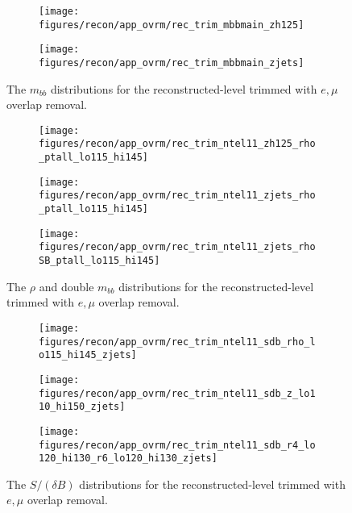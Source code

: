 \begin{figure}[!htbp]\captionsetup{justification=centering}
\begin{center}
\begin{subfigure}[t]{18pc}\centering\texttt{[image: figures/recon/app\_ovrm/rec\_trim\_mbbmain\_zh125]}\caption{}\end{subfigure}
\begin{subfigure}[t]{18pc}\centering\texttt{[image: figures/recon/app\_ovrm/rec\_trim\_mbbmain\_zjets]}\caption{}\end{subfigure}
\caption{\label{fig:mbbwz}The $m_{bb}$ distributions for the reconstructed-level trimmed with $e,\mu$ overlap removal.}
\end{center}
\end{figure}
\begin{figure}[!htbp]\captionsetup{justification=centering}
\begin{center}
\begin{subfigure}[t]{18pc}\centering\texttt{[image: figures/recon/app\_ovrm/rec\_trim\_ntel11\_zh125\_rho\_ptall\_lo115\_hi145]}\caption{}\end{subfigure}
\begin{subfigure}[t]{18pc}\centering\texttt{[image: figures/recon/app\_ovrm/rec\_trim\_ntel11\_zjets\_rho\_ptall\_lo115\_hi145]}\caption{}\end{subfigure}
\begin{subfigure}[t]{18pc}\centering\texttt{[image: figures/recon/app\_ovrm/rec\_trim\_ntel11\_zjets\_rhoSB\_ptall\_lo115\_hi145]}\caption{}\end{subfigure}
\caption{\label{fig:mbbwz}The $\rho$ and double $m_{bb}$ distributions for the reconstructed-level trimmed with $e,\mu$ overlap removal.}
\end{center}
\end{figure}
\begin{figure}[!htbp]\captionsetup{justification=centering}
\begin{center}
\begin{subfigure}[t]{18pc}\centering\texttt{[image: figures/recon/app\_ovrm/rec\_trim\_ntel11\_sdb\_rho\_lo115\_hi145\_zjets]}\caption{}\end{subfigure}
\begin{subfigure}[t]{18pc}\centering\texttt{[image: figures/recon/app\_ovrm/rec\_trim\_ntel11\_sdb\_z\_lo110\_hi150\_zjets]}\caption{}\end{subfigure}
\begin{subfigure}[t]{18pc}\centering\texttt{[image: figures/recon/app\_ovrm/rec\_trim\_ntel11\_sdb\_r4\_lo120\_hi130\_r6\_lo120\_hi130\_zjets]}\caption{}\end{subfigure}
\caption{\label{fig:mbbwz}The $S/(\delta B)$ distributions for the reconstructed-level trimmed with $e,\mu$ overlap removal.}
\end{center}
\end{figure}
\clearpage

